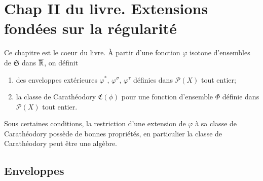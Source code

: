 \section{Chap II du livre. Extensions fondées sur la régularité}\label{ExtenRegul}
Ce chapitre est le coeur du livre. À partir d'une fonction $\varphi$ isotone d'ensembles de $\mathfrak{S}$ dans $\overline{\mathbb{R}}$, on définit
\begin{enumerate}
 \item des enveloppes extérieures $\varphi^*$, $\varphi^\sigma$, $\varphi^\tau$ définies dans $\mathcal{P}(X)$ tout entier;
 \item la classe de Carathéodory $\mathfrak{C}(\phi)$ pour une fonction d'ensemble $\Phi$ définie dans $\mathcal{P}(X)$ tout entier.
\end{enumerate}
Sous certaines conditions, la restriction d'une extension de $\varphi$ à sa classe de Carathéodory possède de bonnes propriétés, en particulier la classe de Carathéodory peut être une algèbre.

\subsection{Enveloppes}\label{Enveloppes}

